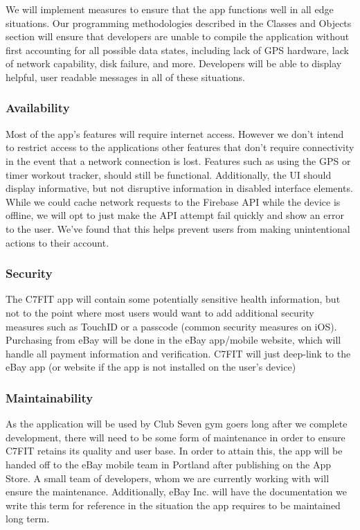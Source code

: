 \documentclass[letterpaper,10pt,titlepage]{article}
\begin{document}
We will implement measures to ensure that the app functions well in all edge situations. Our programming methodologies described in the Classes and Objects section will ensure that developers are unable to compile the application without first accounting for all possible data states, including lack of GPS hardware, lack of network capability, disk failure, and more. Developers will be able to display helpful, user readable messages in all of these situations.

\subsubsection{Availability}

Most of the app’s features will require internet access. However we don’t intend to restrict access to the applications other features that don’t require connectivity in the event that a network connection is lost. Features such as using the GPS or timer workout tracker, should still be functional. Additionally, the UI should display informative, but not disruptive information in disabled interface elements.\\

While we could cache network requests to the Firebase API while the device is offline, we will opt to just make the API attempt fail quickly and show an error to the user. We’ve found that this helps prevent users from making unintentional actions to their account.

\subsubsection{Security}

The C7FIT app will contain some potentially sensitive health information, but not to the point where most users would want to add additional security measures such as TouchID or a passcode (common security measures on iOS).\\

Purchasing from eBay will be done in the eBay app/mobile website, which will handle all payment information and verification. C7FIT will just deep-link to the eBay app (or website if the app is not installed on the user’s device)

\subsubsection{Maintainability}

As the application will be used by Club Seven gym goers long after we complete development, there will need to be some form of maintenance in order to ensure C7FIT retains its quality and user base. In order to attain this, the app will be handed off to the eBay mobile team in Portland after publishing on the App Store. A small team of developers, whom we are currently working with will ensure the maintenance. Additionally, eBay Inc. will have the documentation we write this term for reference in the situation the app requires to be maintained long term.
\end{document}
